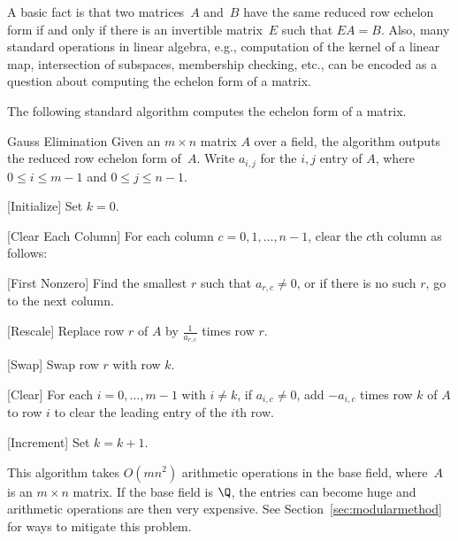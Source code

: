 A basic fact is that two matrices~$A$ and~$B$ have the same reduced
row echelon form if and only if there is an invertible matrix~$E$ such
that $EA = B$.  Also, many standard operations in linear algebra,
e.g., computation of the kernel of a linear map, intersection of
subspaces, membership checking, etc., can be encoded as a question
about computing the echelon form of a matrix.


The following standard algorithm computes the echelon form of a
matrix.
\begin{algorithm}{Gauss Elimination}\label{alg:gauss}%
Given an  $m\times n$ matrix $A$ over a field,
the algorithm outputs the reduced row echelon form of~$A$.
Write $a_{i,j}$ for the $i,j$ entry of $A$,
where $0\leq i \leq m-1$ and $0\leq j \leq n-1$.
\begin{steps}
  \item{} [Initialize] Set $k=0$.
  \item{} [Clear Each Column] For each column $c=0,1,\ldots, n-1$,
     clear the $c$th column as follows:
     \begin{steps}
       \item{} [First Nonzero] Find the smallest $r$ such that
       $a_{r,c}\neq 0$, or if there is no such $r$, go to the next column. 
       \item{} [Rescale] Replace row $r$ of $A$ by $\frac{1}{a_{r,c}}$ times row $r$.
       \item{} [Swap] Swap row $r$ with row $k$.
       \item{} [Clear] For each $i=0,\ldots, m-1$ with $i\neq k$,
         if $a_{i,c}\neq 0$, add $-a_{i,c}$ times row $k$ of $A$ to 
         row $i$ to clear the leading entry of the $i$th row. 
       \item{} [Increment] Set $k=k+1$.
    \end{steps}
\end{steps}
\end{algorithm}
This algorithm takes $O(mn^2)$ arithmetic operations in the base field,
where~$A$ is an $m\times n$ matrix.  If the base field is $\Q$, the
entries can become huge and arithmetic operations are then
very expensive.  See Section~\ref{sec:modularmethod} for ways
to mitigate this problem.

